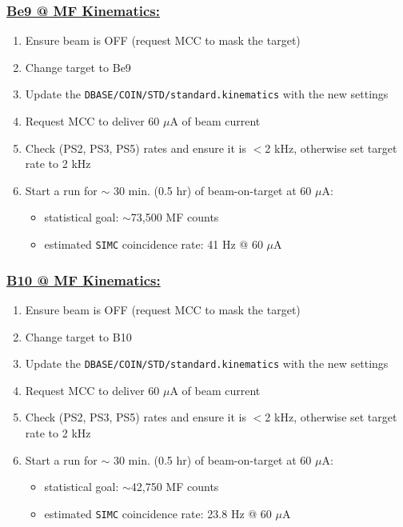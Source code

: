 \documentclass{article}
\begin{document}
\subsubsection*{\underline{Be9 @ MF Kinematics:}}
\begin{enumerate}
\item Ensure beam is OFF (request MCC to mask the target)
\item Change target to Be9
\item Update the \texttt{DBASE/COIN/STD/standard.kinematics} with the new settings
\item Request MCC to deliver 60 $\mu$A of beam current
\item Check (PS2, PS3, PS5) rates and ensure it is $<$2 kHz, otherwise set target rate to 2 kHz
\item Start a run for $\sim$ 30 min. (0.5 hr) of beam-on-target at 60 $\mu$A:
\begin{itemize}
    \item statistical goal: $\sim$73,500 MF counts
    \item estimated \texttt{SIMC} coincidence rate: 41 Hz @ 60 $\mu$A
\end{itemize}
\end{enumerate}

\subsubsection*{\underline{B10 @ MF Kinematics:}}
\begin{enumerate}
\item Ensure beam is OFF (request MCC to mask the target)
\item Change target to B10
\item Update the \texttt{DBASE/COIN/STD/standard.kinematics} with the new settings
\item Request MCC to deliver 60 $\mu$A of beam current
\item Check (PS2, PS3, PS5) rates and ensure it is $<$2 kHz, otherwise set target rate to 2 kHz
\item Start a run for $\sim$ 30 min. (0.5 hr) of beam-on-target at 60 $\mu$A:
\begin{itemize}
    \item statistical goal: $\sim$42,750 MF counts
    \item estimated \texttt{SIMC} coincidence rate: 23.8 Hz @ 60 $\mu$A
\end{itemize}
\end{enumerate}
\end{document}
